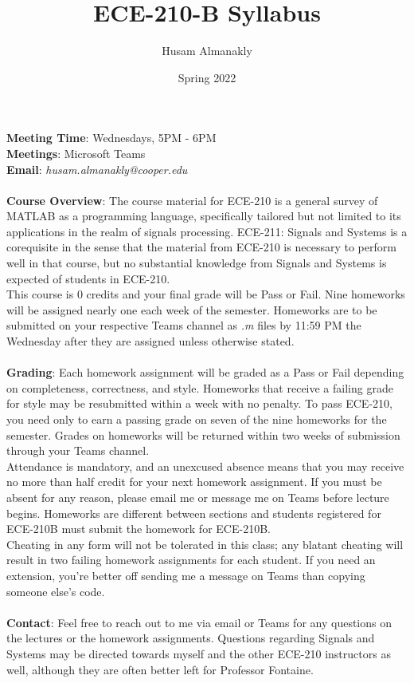 \documentclass[11pt]{article}
\title{ECE-210-B Syllabus}
\author{Husam Almanakly}
\date{Spring 2022}
\begin{document}
\noindent\textbf{Meeting Time}: Wednesdays, 5PM - 6PM \\
\textbf{Meetings}: Microsoft Teams \\
\textbf{Email}: \textit{husam.almanakly@cooper.edu} \\ \\
\textbf{Course Overview}: The course material for ECE-210 is a general survey of MATLAB as a programming language, specifically tailored but not limited to its applications in the realm of signals processing. ECE-211: Signals and Systems is a corequisite in the sense that the material from ECE-210 is necessary to perform well in that course, but no substantial knowledge from Signals and Systems is expected of students in ECE-210. \\

This course is 0 credits and your final grade will be Pass or Fail. Nine homeworks will be assigned nearly one each week of the semester. Homeworks are to be submitted on your respective Teams channel as \textit{.m} files by 11:59 PM the Wednesday after they are assigned unless otherwise stated. \\ \\
\textbf{Grading}: Each homework assignment will be graded as a Pass or Fail depending on completeness, correctness, and style. Homeworks that receive a failing grade for style may be resubmitted within a week with no penalty. To pass ECE-210, you need only to earn a passing grade on seven of the nine homeworks for the semester. Grades on homeworks will be returned within two weeks of submission through your Teams channel.\\

Attendance is mandatory, and an unexcused absence means that you may receive no more than half credit for your next homework assignment. If you must be absent for any reason, please email me or message me on Teams before lecture begins. Homeworks are different between sections and students registered for ECE-210B must submit the homework for ECE-210B.\\ 

Cheating in any form will not be tolerated in this class; any blatant cheating will result in two failing homework assignments for each student. If you need an extension, you're better off sending me a message on Teams than copying someone else's code. \\ \\
\textbf{Contact}: Feel free to reach out to me via email or Teams for any questions on the lectures or the homework assignments. Questions regarding Signals and Systems may be directed towards myself and the other ECE-210 instructors as well, although they are often better left for Professor Fontaine. \\
\end{document}
